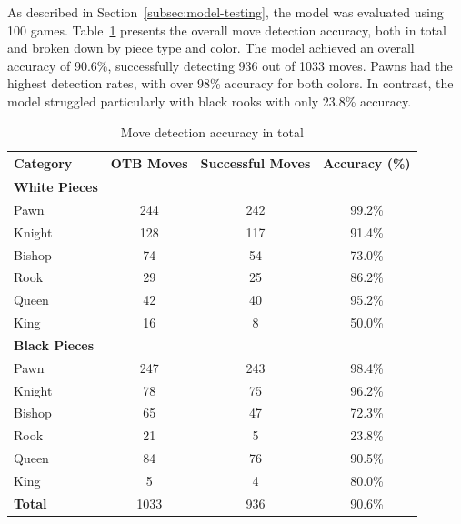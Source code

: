 As described in Section~\ref{subsec:model-testing}, the model was evaluated using 100 games. Table~\ref{tab:accuracy-total} presents the overall move detection accuracy, both in total and broken down by piece type and color. The model achieved an overall accuracy of 90.6\%, successfully detecting 936 out of 1033 moves. Pawns had the highest detection rates, with over 98\% accuracy for both colors. In contrast, the model struggled particularly with black rooks with only 23.8\% accuracy.

\begin{table}[htbp]
\centering
\caption{Move detection accuracy in total}
\label{tab:accuracy-total}
\begin{tabular}{lccc}
\toprule
\textbf{Category} & \textbf{OTB Moves} & \textbf{Successful Moves} & \textbf{Accuracy (\%)} \\
\midrule
\textbf{White Pieces} & & & \\
\hspace{1em}Pawn  & 244 & 242 & 99.2\% \\
\hspace{1em}Knight & 128 & 117 & 91.4\% \\
\hspace{1em}Bishop & 74  & 54  & 73.0\% \\
\hspace{1em}Rook   & 29  & 25  & 86.2\% \\
\hspace{1em}Queen  & 42  & 40  & 95.2\% \\
\hspace{1em}King   & 16  & 8   & 50.0\% \\
\midrule
\textbf{Black Pieces} & & & \\
\hspace{1em}Pawn  & 247 & 243 & 98.4\% \\
\hspace{1em}Knight & 78  & 75  & 96.2\% \\
\hspace{1em}Bishop & 65  & 47  & 72.3\% \\
\hspace{1em}Rook   & 21  & 5   & 23.8\% \\
\hspace{1em}Queen  & 84  & 76  & 90.5\% \\
\hspace{1em}King   & 5   & 4   & 80.0\% \\
\midrule
\textbf{Total} & 1033 & 936 & 90.6\% \\
\bottomrule
\end{tabular}
\end{table}


